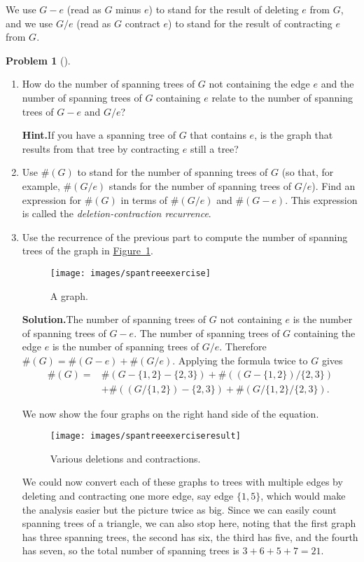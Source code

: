 \documentclass[10pt,]{book}
\theoremstyle{plain}
\theoremstyle{definition}
\newtheorem{activity}[project]{Problem}
\theoremstyle{definition}
\numberwithin{equation}{chapter}
\newcommand{\amp}{&}
\begin{document}
%
\par
We use \(G-e\) (read as \(G\) minus \(e\)) to stand for the result of deleting \(e\) from \(G\), and we use \(G/e\) (read as \(G\) contract \(e\)) to stand for the result of contracting \(e\) from \(G\).%
\begin{activity}[]\label{activity-119}
\leavevmode%
\begin{enumerate}[font=\bfseries,label=(\alph*),ref=\alph*]
\item\label{task-95} How do the number of spanning trees of \(G\) not containing the edge \(e\) and the number of spanning trees of \(G\) containing \(e\) relate to the number of spanning trees of \(G-e\) and \(G/e\)?%
\par\medskip\noindent%
\textbf{Hint.}\quad If you have a spanning tree of \(G\) that contains \(e\), is the graph that results from that tree by contracting \(e\) still a tree?%
\item\label{task-96} Use \(\#(G)\) to stand for the number of spanning trees of \(G\) (so that, for example, \(\#(G/e)\) stands for the number of spanning trees of \(G/e\)). Find an expression for \(\#(G)\) in terms of \(\#(G/e)\) and \(\#(G-e)\). This expression is called the \emph{deletion-contraction recurrence}.%
\item\label{task-97} Use the recurrence of the previous part to compute the number of spanning trees of the graph in \hyperref[spantreeexercise]{Figure~\ref{spantreeexercise}}.%
\begin{figure}
\centering
\texttt{[image: images/spantreeexercise]}
\caption{A graph.\label{spantreeexercise}}
\end{figure}
\par\medskip\noindent%
\textbf{Solution.}\quad The number of spanning trees of \(G\) not containing \(e\) is the number of spanning trees of \(G-e\). The number of spanning trees of \(G\) containing the edge \(e\) is the number of spanning trees of \(G/e\). Therefore \(\#(G) =\#(G-e)
+\#(G/e)\). Applying the formula twice to \(G\) gives%
\begin{align*}
\#(G)
= &\#(G-\{1,2\}-\{2,3\}) + \#((G-\{1,2\})/\{2,3\})\\
\amp +
\#((G/\{1,2\})-\{2,3\}) +
\#(G/\{1,2\}/\{2,3\}).
\end{align*}
%
\par
We now show the four graphs on the right hand side of the equation.%
\begin{figure}
\centering
\texttt{[image: images/spantreeexerciseresult]}
\caption{Various deletions and contractions.\label{spantreeexerciseresult}}
\end{figure}
We could now convert each of these graphs to trees with multiple edges by deleting and contracting one more edge, say edge \(\{1,5\}\), which would make the analysis easier but the picture twice as big. Since we can easily count spanning trees of a triangle, we can also stop here, noting that the first graph has three spanning trees, the second has six, the third has five, and the fourth has seven, so the total number of spanning trees is \(3+6+5+7=21\).%
\end{enumerate}
\end{activity}
\end{document}
